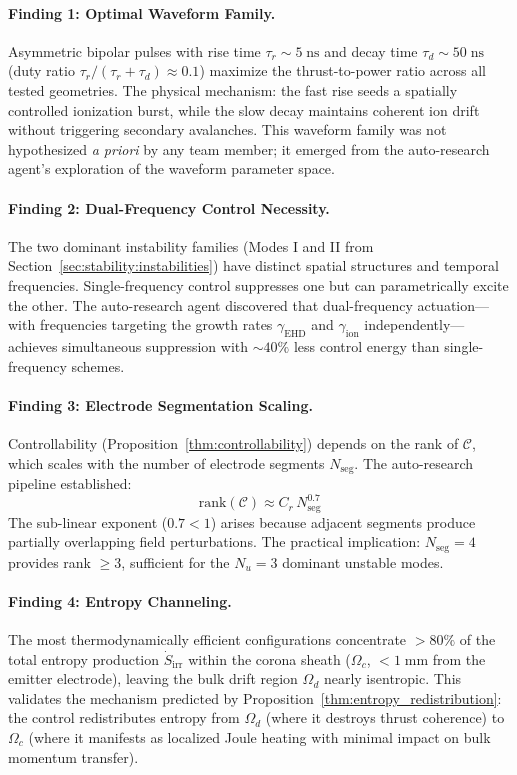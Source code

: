 \documentclass[12pt,twocolumn]{article}
\newcommand{\Sdot}{\dot{S}_{\mathrm{irr}}}
\begin{document}
\paragraph{Finding 1: Optimal Waveform Family.}
Asymmetric bipolar pulses with rise time $\tau_r \sim 5\;\mathrm{ns}$
and decay time $\tau_d \sim 50\;\mathrm{ns}$ (duty ratio
$\tau_r/(\tau_r + \tau_d) \approx 0.1$) maximize the thrust-to-power
ratio across all tested geometries. The physical mechanism: the fast
rise seeds a spatially controlled ionization burst, while the slow
decay maintains coherent ion drift without triggering secondary
avalanches. This waveform family was not hypothesized \textit{a priori}
by any team member; it emerged from the auto-research agent's
exploration of the waveform parameter space.

\paragraph{Finding 2: Dual-Frequency Control Necessity.}
The two dominant instability families (Modes I and II from
Section~\ref{sec:stability:instabilities}) have distinct spatial
structures and temporal frequencies. Single-frequency control
suppresses one but can parametrically excite the other. The
auto-research agent discovered that dual-frequency actuation---with
frequencies targeting the growth rates $\gamma_{\mathrm{EHD}}$ and
$\gamma_{\mathrm{ion}}$ independently---achieves simultaneous
suppression with $\sim 40\%$ less control energy than
single-frequency schemes.

\paragraph{Finding 3: Electrode Segmentation Scaling.}
Controllability (Proposition~\ref{thm:controllability}) depends on the
rank of $\mathcal{C}$, which scales with the number of electrode
segments $N_{\mathrm{seg}}$. The auto-research pipeline established:
\begin{equation}
  \mathrm{rank}(\mathcal{C})
  \approx C_r\,N_{\mathrm{seg}}^{0.7}
  \label{eq:rank_scaling}
\end{equation}
The sub-linear exponent ($0.7 < 1$) arises because adjacent segments
produce partially overlapping field perturbations. The practical
implication: $N_{\mathrm{seg}} = 4$ provides rank $\geq 3$,
sufficient for the $N_u = 3$ dominant unstable modes.

\paragraph{Finding 4: Entropy Channeling.}
The most thermodynamically efficient configurations concentrate
$> 80\%$ of the total entropy production $\Sdot$ within the corona
sheath ($\Omega_c$, $< 1\;\mathrm{mm}$ from the emitter electrode),
leaving the bulk drift region $\Omega_d$ nearly isentropic. This
validates the mechanism predicted by Proposition~\ref{thm:entropy_redistribution}:
the control redistributes entropy from $\Omega_d$ (where it destroys
thrust coherence) to $\Omega_c$ (where it manifests as localized
Joule heating with minimal impact on bulk momentum transfer).
\end{document}
